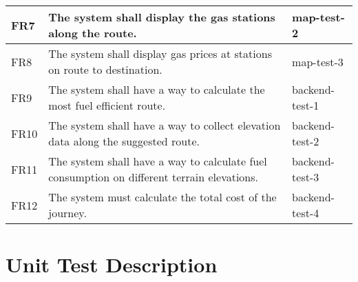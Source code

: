 \documentclass[12pt, titlepage]{article}
\begin{document}
\begin{table}[!hbp]
\begin{tabular}{|p{3.5cm}|p{6.5cm}|p{4.5cm}|}
	FR7                     & The system shall display the gas stations along the route.                                                                                                         & map-test-2                                                                                          \\ \hline
	FR8                    & The system shall display gas prices at stations on route to destination.                                                                                                         & map-test-3                                                                                          \\ \hline
	FR9                     & The system shall have a way to calculate the most fuel efficient route.                                                                                                         & backend-test-1                                                                                          \\ \hline
	FR10                    & The system shall have a way to collect elevation data along the suggested route.                                                                                                         & backend-test-2                                                                                          \\ \hline
	FR11                    & The system shall have a way to calculate fuel consumption on different terrain elevations.                                                                                                         & backend-test-3                                                                                          \\ \hline
	FR12                     & The system must calculate the total cost of the journey.                                                                                                         & backend-test-4                                                                                          \\ \hline
	
	\end{tabular}
	
  \end{table}

\newpage

\section{Unit Test Description}
\end{document}
